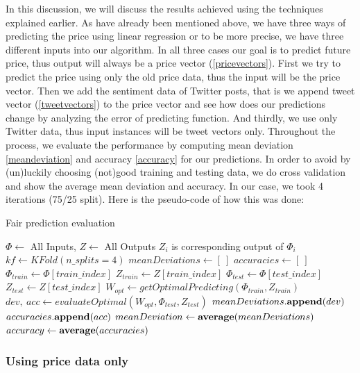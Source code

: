 \documentclass[a4paper,11pt,oneside]{article}
\begin{document}
  In this discussion, we will discuss the results achieved using the techniques explained earlier. As have already been mentioned above, we have three ways of predicting the price using linear regression or to be more precise, we have three different inputs into our algorithm. In all three cases our goal is to predict future price, thus output will always be a price vector (\ref{pricevectors}). First we try to predict the price using only the old price data, thus the input will be the price vector. Then we add the sentiment data of Twitter posts, that is we append tweet vector (\ref{tweetvectors}) to the price vector and see how does our predictions change by analyzing the error of predicting function. And thirdly, we use only Twitter data, thus input instances will be tweet vectors only. Throughout the process, we evaluate the performance by computing mean deviation \eqref{meandeviation} and accuracy \eqref{accuracy} for our predictions. In order to avoid by (un)luckily choosing (not)good training and testing data, we do cross validation and show the average mean deviation and accuracy. In our case, we took 4 iterations (75/25 split). Here is the pseudo-code of how this was done:
  
  \begin{algorithm}
  	\caption{Fair prediction evaluation}
  	\begin{algorithmic} 
  		\REQUIRE $\Phi \leftarrow$ All Inputs, $Z \leftarrow$ All Outputs
  		\ENSURE $Z_i$ is corresponding output of $\Phi_i$ 
  		\STATE 
  		$kf \leftarrow KFold(n\_splits=4)$ \cite{pythonkfold}
  		\STATE $meanDeviations \leftarrow [\ ]$
  		\STATE $accuracies \leftarrow [\ ]$
  		\STATE $\Phi_{train} \leftarrow \Phi[train\_index]$
  		\STATE $Z_{train} \leftarrow Z[train\_index]$
  		\STATE $\Phi_{test} \leftarrow \Phi[test\_index]$
  		\STATE $Z_{test} \leftarrow Z[test\_index]$
  		\STATE $W_{opt}  \leftarrow getOptimalPredicting(\Phi_{train}, Z_{train})$
  		\STATE $dev,\ acc \leftarrow evaluateOptimal(W_{opt}, \Phi_{test}, Z_{test})$
  		\STATE $ meanDeviations{\bf .append}(dev) $
  		\STATE $ accuracies{\bf .append}(acc) $
  		\ENDFOR
  		\STATE $meanDeviation \leftarrow {\bf average}(meanDeviations)$
  		\STATE $accuracy \leftarrow {\bf average}(accuracies)$
  	\end{algorithmic}
  \end{algorithm}
  
  \subsubsection{Using price data only}
\end{document}
